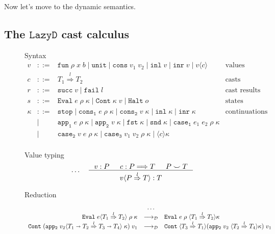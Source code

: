 \documentclass[acmsmall,review,anonymous]{acmart}\settopmatter{printfolios=true,printccs=false,printacmref=false}
\newcommand{\stxrule}[3]{#1 & ::= & #3 & \text{#2}\\}
\newcommand{\stxrulecont}[1]{& | & #1 & \\}
\newcommand{\lazyD}{$\mathtt{Lazy D}$}
\newcommand{\sOOinspect}[3]{\mathtt{Eval} \; #1 \; #2 \; #3}
\newcommand{\sOOreturn}[2]{\mathtt{Cont} \; #2 \; #1}
\newcommand{\sOOhalt}[1]{\mathtt{Halt} \; #1}
\newcommand{\POOfun}[2]{#1 \shortrightarrow #2}
\newcommand{\eOOcast}[4]{#1 \langle \cOOcast{#2}{#3}{#4} \rangle}
\newcommand{\cOOcast}[3]{#1 \overset{#2}{\Rightarrow} #3}
\newcommand{\vOOcast}[2]{#1\langle#2\rangle}
\newcommand{\vOOfun}[3]{\mathtt{fun} \; #1 \; #2 \; #3}
\newcommand{\vOOtt}[0]{\mathtt{unit}}
\newcommand{\vOOcons}[2]{\mathtt{cons}\;#1\;#2}
\newcommand{\vOOinl}[1]{\mathtt{inl}\;#1}
\newcommand{\vOOinr}[1]{\mathtt{inr}\;#1}
\newcommand{\rOOsucc}[1]{\mathtt{succ}\;#1}
\newcommand{\rOOfail}[1]{\mathtt{fail}\;#1}
\newcommand{\judgeDCreduce}[2]{#1 \longrightarrow_{\mathcal{D}} #2}
\newcommand{\redrule}[3]{#1 & \longrightarrow_\mathcal{D} & #2 & #3\\}
\begin{document}
Now let's move to the dynamic semantics. 

\subsection{The \lazyD{} cast calculus}

\begin{figure}
	Syntax
	\[
	\begin{array}{rclr}
	
	\stxrule{v}{values}{
		\vOOfun{\rho}{x}{b} \mid
		\vOOtt{} \mid
		\vOOcons{v_1}{v_2} \mid
		\vOOinl{v} \mid
		\vOOinr{v} \mid		
		\vOOcast{v}{c}
	}
	\stxrule{c}{casts}{
		\cOOcast{T_1}{l}{T_2}
	}
	\stxrule{r}{cast results}{
		\rOOsucc{v} \mid
		\rOOfail{l}
	}
	\stxrule{s}{states}{
		\sOOinspect{e}{\rho}{\kappa} \mid{}
		\sOOreturn{v}{\kappa} \mid{}
		\sOOhalt{o}
	}
		
	\stxrule{\kappa}{continuations}{
		\mathtt{stop} \mid{}
		\mathtt{cons_1} \; e \; \rho \; \kappa \mid{}
		\mathtt{cons_2} \; v \; \kappa \mid{}
		\mathtt{inl} \; \kappa \mid{}
		\mathtt{inr} \; \kappa
	}
	\stxrulecont{
		\mathtt{app_1} \; e \; \rho \; \kappa \mid{}
		\mathtt{app_2} \; v \; \kappa \mid{}
		\mathtt{fst} \; \kappa \mid{}
		\mathtt{snd} \; \kappa \mid
		\mathtt{case_1} \; e_1 \; e_2 \; \rho \; \kappa
	}
	\stxrulecont{	
		\mathtt{case_2} \; v   \; e   \; \rho \; \kappa \mid{}
		\mathtt{case_3} \; v_1 \; v_2 \; \rho \; \kappa \mid
		\langle c \rangle \kappa
	}
	\end{array}
	\]
	
	Value typing 
	\begin{gather*}
	\dots \quad
	\inference{
		v : P &
		c : P \Longrightarrow T &
		P \smile T
	}{
		\vOOcast{v}{\cOOcast{P}{l}{T}} : T
	}
	\end{gather*}
	
	
	Reduction \fbox{$ \judgeDCreduce{s}{s} $}
	\[
	\begin{array}{rclr}
	
	& \dots  \\
	\redrule{
		\sOOinspect{\eOOcast{e}{T_1}{l}{T_2}}{\rho}{\kappa}
	}{
		\sOOinspect{e}{\rho}{\langle\cOOcast{T_1}{l}{T_2}\rangle\kappa}
	}{}
	\redrule{
		\sOOreturn{v_1}{(\mathtt{app_2} \; \vOOcast{v_2}{
				\cOOcast{\POOfun{T_1}{T_2}}{l}{\POOfun{T_3}{T_4}}
			} \; \kappa)}
	}{
		\sOOreturn{v_1}{
		\langle\cOOcast{T_3}{l}{T_1}\rangle
		(\mathtt{app_2} \; v_2 \; 
		\langle\cOOcast{T_2}{l}{T_4}\rangle \kappa)}
	}{}
	

\end{array}\]
\end{figure}
\end{document}

